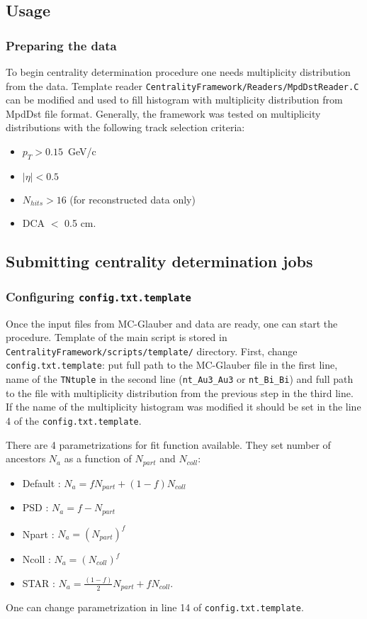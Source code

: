\documentclass[11pt]{article}
\begin{document}
\subsection{Usage}
\subsubsection{Preparing the data}
To begin centrality determination procedure one needs multiplicity distribution from the data. Template reader \texttt{CentralityFramework/Readers/MpdDstReader.C} can be modified and used to fill histogram with multiplicity distribution from MpdDst file format. Generally, the framework was tested on multiplicity distributions with the following track selection criteria:
\begin{itemize}
    \item $p_{T} > 0.15$~GeV/c
    \item $|\eta| < 0.5$
    \item $N_{hits} > 16$ (for reconstructed data only)
    \item DCA $<$ 0.5 cm.
\end{itemize}

\subsection{Submitting centrality determination jobs}
\subsubsection{Configuring \texttt{config.txt.template}}
Once the input files from MC-Glauber and data are ready, one can start the procedure.
Template of the main script is stored in \texttt{CentralityFramework/scripts/template/} directory.
First, change \texttt{config.txt.template}: put full path to the MC-Glauber file in the first line, name of the \texttt{TNtuple} in the second line (\texttt{nt\_Au3\_Au3} or \texttt{nt\_Bi\_Bi}) and full path to the file with multiplicity distribution from the previous step in the third line.
If the name of the multiplicity histogram was modified it should be set in the line 4 of the \texttt{config.txt.template}.

There are 4 parametrizations for fit function available. They set number of ancestors $N_{a}$ as a function of $N_{part}$ and $N_{coll}$:
\begin{itemize}
    \item Default : $N_{a} = fN_{part} + (1-f)N_{coll}$
    \item PSD : $N_{a} = f - N_{part}$
    \item Npart : $N_{a} = \left(N_{part}\right)^{f}$
    \item Ncoll : $N_{a} = \left(N_{coll}\right)^{f}$
    \item STAR : $N_{a} = \frac{(1-f)}{2}N_{part} + fN_{coll}$.
\end{itemize}
One can change parametrization in line 14 of \texttt{config.txt.template}.
\end{document}
